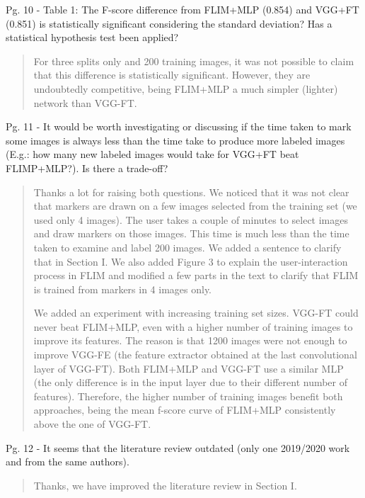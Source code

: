\documentclass[a4paper,12pt]{article}
\newcommand{\rwr}[1]{\par \medskip \noindent {\bf Reviewer #1: }}
\newcommand{\ans}{\smallskip\begin{quote}  \noindent }
\newcommand{\eans}{\end{quote}}
\begin{document}
\rwr{2} Pg. 10 - Table 1: The F-score difference from FLIM+MLP (0.854) and VGG+FT (0.851) is statistically significant considering the standard deviation?  Has a statistical hypothesis test been applied?

\ans 

For three splits only and 200 training images, it was not possible to claim that this difference is statistically significant. However, they are undoubtedly competitive, being FLIM+MLP a much simpler (lighter) network than VGG-FT.   
\eans

\rwr{2} Pg. 11 - It would be worth investigating or discussing if the time taken to mark some images is always less than the time take to produce more labeled images (E.g.: how many new labeled images would take for VGG+FT beat FLIMP+MLP?). Is there a trade-off?

\ans Thanks a lot for raising both questions. We noticed that it was not clear that markers are drawn on a few images selected from the training set (we used only 4 images). The user takes a couple of minutes to select images and draw markers on those images. This time is much less than the time taken to examine and label 200 images. We added a sentence to clarify that in Section I. We also added Figure 3 to explain the user-interaction process in FLIM and modified a few parts in the text to clarify that FLIM is trained from markers in 4 images only.  

We added an experiment with increasing training set sizes. VGG-FT could never beat FLIM+MLP, even with a higher number of training images to improve its features. The reason is that 1200 images were not enough to improve VGG-FE (the feature extractor obtained at the last convolutional layer of VGG-FT). Both FLIM+MLP and VGG-FT use a similar MLP (the only difference is in the input layer due to their different number of features). Therefore, the higher number of training images benefit both approaches, being the mean f-score curve of FLIM+MLP consistently above the one of VGG-FT.

\eans

\rwr{2} Pg. 12 - It seems that the literature review outdated (only one 2019/2020 work and from the same authors).

\ans
Thanks, we have improved the literature review in Section I.
\eans
\end{document}
